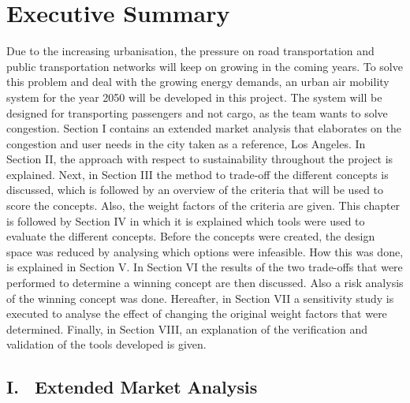 \newpage
\chapter*{Executive Summary}
\label{ch-ES}

Due to the increasing urbanisation, the pressure on road transportation and public transportation networks will keep on growing in the coming years. To solve this problem and deal with the growing energy demands, an urban air mobility system for the year 2050 will be developed in this project. The system will be designed for transporting passengers and not cargo, as the team wants to solve congestion. Section I contains an extended market analysis that elaborates on the congestion and user needs in the city taken as a reference, Los Angeles. In Section II, the approach with respect to sustainability throughout the project is explained. Next, in Section III the method to trade-off the different concepts is discussed, which is followed by an overview of the criteria that will be used to score the concepts. Also, the weight factors of the criteria are given. This chapter is followed by Section IV in which it is explained which tools were used to evaluate the different concepts. Before the concepts were created, the design space was reduced by analysing which options were infeasible. How this was done, is explained in Section V. In Section VI the results of the two trade-offs that were performed to determine a winning concept are then discussed. Also a risk analysis of the winning concept was done. Hereafter, in Section VII a sensitivity study is executed to analyse the effect of changing the original weight factors that were determined. Finally, in Section VIII, an explanation of the verification and validation of the tools developed is given.



\section*{I. \ Extended Market Analysis}
\label{ES.MA}

